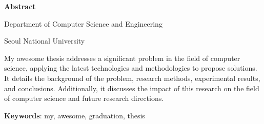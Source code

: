 \vspace*{8pt}

\begin{center}
    {\fontsize{16}{0}\selectfont \textbf{Abstract}}

    \vspace*{10pt}

    {\fontsize{20}{0}\selectfont {\engpapertitle}}
\end{center}

\vspace*{20pt}

\begin{flushright}
    {
        \fontsize{14}{0}\selectfont

        \engauthor

        \vspace*{10pt}

        Department of Computer Science and Engineering

        \vspace*{10pt}

        Seoul National University

    }
\end{flushright}

\vspace*{10pt}

{\fontsize{11}{13}\selectfont

My awesome thesis addresses a significant problem in the field of computer science, applying the latest technologies and methodologies to propose solutions. It details the background of the problem, research methods, experimental results, and conclusions. Additionally, it discusses the impact of this research on the field of computer science and future research directions.

}

\vspace*{10pt}

\quad \textbf{Keywords}: my, awesome, graduation, thesis

\thispagestyle{empty}
\pagebreak
